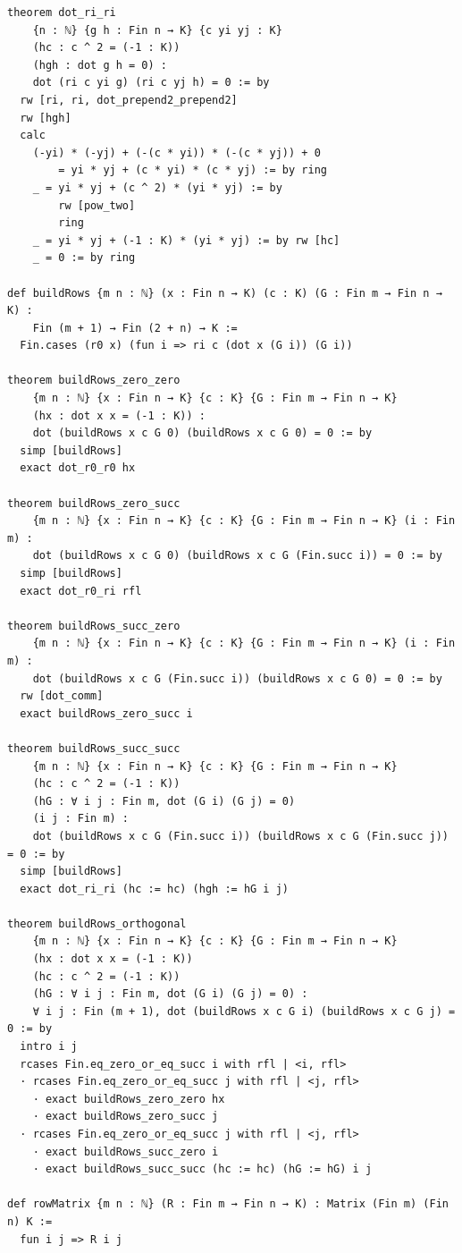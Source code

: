 \documentclass[12pt]{article}
\begin{document}
\begin{lstlisting}[caption={Lean verification for Theorem~\ref{thm:gram-zero}.}]
theorem dot_ri_ri
    {n : ℕ} {g h : Fin n → K} {c yi yj : K}
    (hc : c ^ 2 = (-1 : K))
    (hgh : dot g h = 0) :
    dot (ri c yi g) (ri c yj h) = 0 := by
  rw [ri, ri, dot_prepend2_prepend2]
  rw [hgh]
  calc
    (-yi) * (-yj) + (-(c * yi)) * (-(c * yj)) + 0
        = yi * yj + (c * yi) * (c * yj) := by ring
    _ = yi * yj + (c ^ 2) * (yi * yj) := by
        rw [pow_two]
        ring
    _ = yi * yj + (-1 : K) * (yi * yj) := by rw [hc]
    _ = 0 := by ring

def buildRows {m n : ℕ} (x : Fin n → K) (c : K) (G : Fin m → Fin n → K) :
    Fin (m + 1) → Fin (2 + n) → K :=
  Fin.cases (r0 x) (fun i => ri c (dot x (G i)) (G i))

theorem buildRows_zero_zero
    {m n : ℕ} {x : Fin n → K} {c : K} {G : Fin m → Fin n → K}
    (hx : dot x x = (-1 : K)) :
    dot (buildRows x c G 0) (buildRows x c G 0) = 0 := by
  simp [buildRows]
  exact dot_r0_r0 hx

theorem buildRows_zero_succ
    {m n : ℕ} {x : Fin n → K} {c : K} {G : Fin m → Fin n → K} (i : Fin m) :
    dot (buildRows x c G 0) (buildRows x c G (Fin.succ i)) = 0 := by
  simp [buildRows]
  exact dot_r0_ri rfl

theorem buildRows_succ_zero
    {m n : ℕ} {x : Fin n → K} {c : K} {G : Fin m → Fin n → K} (i : Fin m) :
    dot (buildRows x c G (Fin.succ i)) (buildRows x c G 0) = 0 := by
  rw [dot_comm]
  exact buildRows_zero_succ i

theorem buildRows_succ_succ
    {m n : ℕ} {x : Fin n → K} {c : K} {G : Fin m → Fin n → K}
    (hc : c ^ 2 = (-1 : K))
    (hG : ∀ i j : Fin m, dot (G i) (G j) = 0)
    (i j : Fin m) :
    dot (buildRows x c G (Fin.succ i)) (buildRows x c G (Fin.succ j)) = 0 := by
  simp [buildRows]
  exact dot_ri_ri (hc := hc) (hgh := hG i j)

theorem buildRows_orthogonal
    {m n : ℕ} {x : Fin n → K} {c : K} {G : Fin m → Fin n → K}
    (hx : dot x x = (-1 : K))
    (hc : c ^ 2 = (-1 : K))
    (hG : ∀ i j : Fin m, dot (G i) (G j) = 0) :
    ∀ i j : Fin (m + 1), dot (buildRows x c G i) (buildRows x c G j) = 0 := by
  intro i j
  rcases Fin.eq_zero_or_eq_succ i with rfl | <i, rfl>
  · rcases Fin.eq_zero_or_eq_succ j with rfl | <j, rfl>
    · exact buildRows_zero_zero hx
    · exact buildRows_zero_succ j
  · rcases Fin.eq_zero_or_eq_succ j with rfl | <j, rfl>
    · exact buildRows_succ_zero i
    · exact buildRows_succ_succ (hc := hc) (hG := hG) i j

def rowMatrix {m n : ℕ} (R : Fin m → Fin n → K) : Matrix (Fin m) (Fin n) K :=
  fun i j => R i j


\end{lstlisting}
\end{document}
